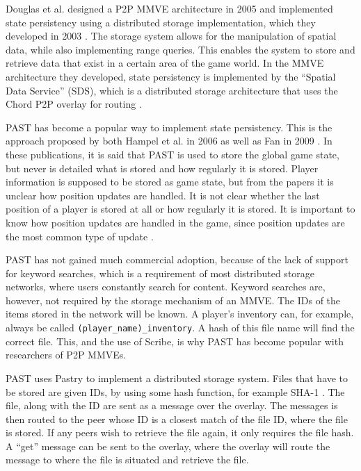 Douglas et al. designed a P2P MMVE architecture in 2005 \cite{Douglas05enablingmassively} and implemented state persistency using a distributed storage implementation, which they developed in 2003 \cite{Harwood03hashingspatial}. The storage system allows for the manipulation of spatial data, while also implementing range queries. This enables the system to store and retrieve data that exist in a certain area of the game world. In the MMVE architecture they developed, state persistency is implemented by the ``Spatial Data Service'' (SDS), which is a distributed storage architecture that uses the Chord P2P overlay for routing \cite{chord}.

PAST has become a popular way to implement state persistency. This is the approach proposed by both Hampel et al. in 2006 \cite{past_storage_focus} as well as Fan in 2009 \cite{Fan_phd}. In these publications, it is said that PAST is used to store the global game state, but never is detailed what is stored and how regularly it is stored. Player information is supposed to be stored as game state, but from the papers it is unclear how position updates are handled. It is not clear whether the last position of a player is stored at all or how regularly it is stored. It is important to know how position updates are handled in the game, since position updates are the most common type of update \cite{knutsson_p2p_first}.

PAST has not gained much commercial adoption, because of the lack of support for keyword searches, which is a requirement of most distributed storage networks, where users constantly search for content. Keyword searches are, however, not required by the storage mechanism of an MMVE. The IDs of the items stored in the network will be known. A player's inventory can, for example, always be called \verb.(player_name)_inventory.. A hash of this file name will find the correct file. This, and the use of Scribe, is why PAST has become popular with researchers of P2P MMVEs.

PAST \cite{PAST_storage} uses Pastry to implement a distributed storage system. Files that have to be stored are given IDs, by using some hash function, for example SHA-1 \cite{SHA}. The file, along with the ID are sent as a message over the overlay. The messages is then routed to the peer whose ID is a closest match of the file ID, where the file is stored. If any peers wish to retrieve the file again, it only requires the file hash. A ``get'' message can be sent to the overlay, where the overlay will route the message to where the file is situated and retrieve the file.


